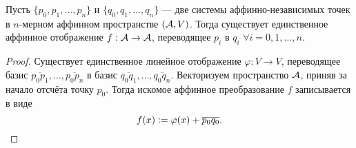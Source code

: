 \begin{theorem}
    Пусть $\{p_0, p_1, \ldots, p_n\}$ и $\{q_0, q_1, \ldots, q_n\}$ --- две системы аффинно-независимых точек в $n$-мерном аффинном пространстве $(\mathcal{A}, V)$. Тогда существует единственное аффинное отображение $f: \mathcal{A} \to \mathcal{A}$, переводящее $p_i$ в $q_i$ $\forall i = 0, 1, \ldots, n$.
\end{theorem}

\begin{proof}
    Существует единственное линейное отображение $\varphi: V \to V$, переводящее базис $\overline{p_0p_1}, \ldots, \overline{p_0p_n}$ в базис $\overline{q_0q_1}, \ldots, \overline{q_0q_n}$. Векторизуем пространство $\mathcal{A}$, приняв за начало отсчёта точку $p_0$. Тогда искомое аффинное преобразование $f$ записывается в виде
    \[
        f(x) \vcentcolon = \varphi(x) + \overline{p_0q_0}.
    \]
\end{proof}

